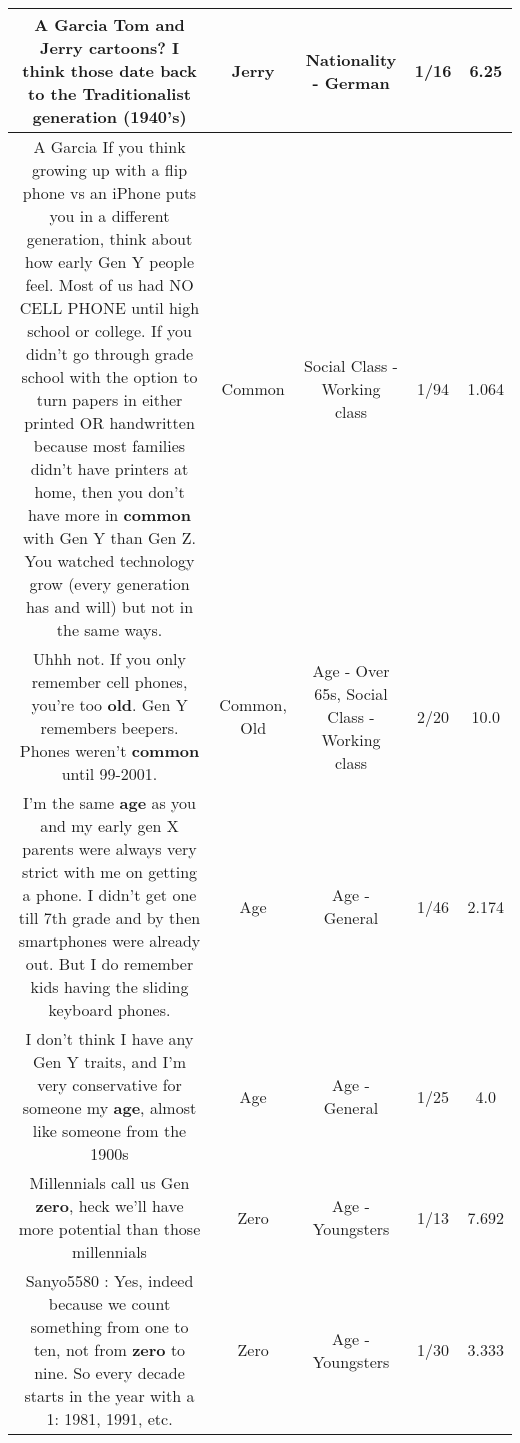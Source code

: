 \documentclass[11pt]{article}
\newlength\mylength
\begin{document}
\begin{center}
\begin{longtable}{|C{.65\mylength}|C{.30\mylength}|C{.12\mylength}|C{.12\mylength}|C{.12\mylength}|}
  \small A Garcia Tom and \textbf{Jerry} cartoons? I think those date back to the Traditionalist generation (1940's)\normalsize   & Jerry & Nationality - German & 1/16 & 6.25 \\  \hline
  \small A Garcia If you think growing up with a flip phone vs an iPhone puts you in a different generation, think about how early Gen Y people feel. Most of us had NO CELL PHONE until high school or college. If you didn't go through grade school with the option to turn papers in either printed OR handwritten because most families didn't have printers at home, then you don't have more in \textbf{common} with Gen Y than Gen Z. You watched technology grow (every generation has and will) but not in the same ways.\normalsize   & Common & Social Class - Working class & 1/94 & 1.064 \\  \hline
  \small Uhhh not. If you only remember cell phones, you're too \textbf{old}. Gen Y remembers beepers. Phones weren't \textbf{common} until 99-2001.\normalsize   & Common, Old & Age - Over 65s, Social Class - Working class & 2/20 & 10.0 \\  \hline
  \small I'm the same \textbf{age} as you and my early gen X parents were always very strict with me on getting a phone. I didn't get one till 7th grade and by then smartphones were already out. But I do remember kids having the sliding keyboard phones.\normalsize   & Age & Age - General & 1/46 & 2.174 \\  \hline
  \small {} I don't think I have any Gen Y traits, and I'm very conservative for someone my \textbf{age}, almost like someone from the 1900s\normalsize   & Age & Age - General & 1/25 & 4.0 \\  \hline
  \small Millennials call us Gen \textbf{zero}, heck we'll have more potential than those millennials\normalsize   & Zero & Age - Youngsters & 1/13 & 7.692 \\  \hline
  \small Sanyo5580 : Yes, indeed because we count something from one to ten, not from \textbf{zero} to nine. So every decade starts in the year with a 1: 1981, 1991, etc.\normalsize   & Zero & Age - Youngsters & 1/30 & 3.333 \\  \hline

\end{longtable}
\end{center}
\end{document}

